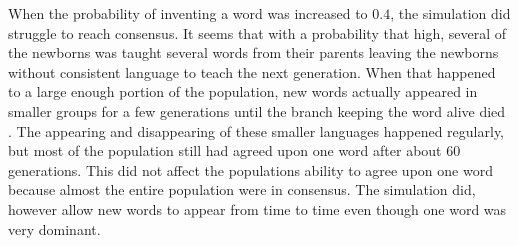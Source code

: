 When the probability of inventing a word was increased to $0.4$, the simulation did struggle to reach consensus. It seems that with a probability that high, several of the newborns was taught several words from their parents leaving the newborns without consistent language to teach the next generation. When that happened to a large enough portion of the population, new words actually appeared in smaller groups for a few generations until the branch keeping the word alive died . The appearing and disappearing of these smaller languages happened regularly, but most of the population still had agreed upon one word after about 60 generations. This did not affect the populations ability to agree upon one word because almost the entire population were in consensus. The simulation did, however allow new words to appear from time to time even though one word was very dominant. 